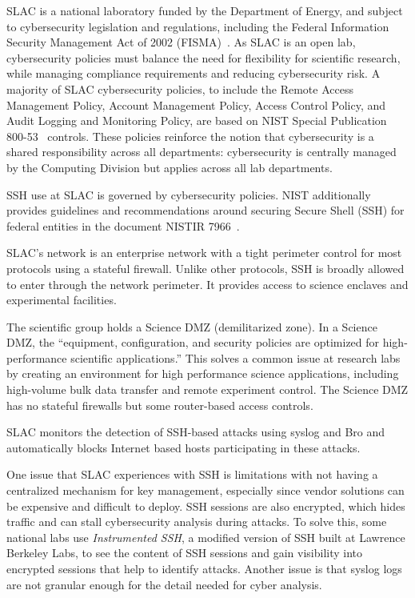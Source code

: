 \documentclass[11pt]{article}
\begin{document}
SLAC is a national laboratory funded by the Department of Energy, and
subject to cybersecurity legislation and regulations, including the
Federal Information Security Management Act of 2002
(FISMA)~\cite{fisma}. As SLAC is an open lab, cybersecurity policies
must balance the need for flexibility for scientific research, while
managing compliance requirements and reducing cybersecurity risk. A
majority of SLAC cybersecurity policies, to include the Remote Access
Management Policy, Account Management Policy, Access Control Policy,
and Audit Logging and Monitoring Policy, are based on NIST Special
Publication 800-53~\cite{nist80053} controls. These policies reinforce
the notion that cybersecurity is a shared responsibility across all
departments: cybersecurity is centrally managed by the Computing
Division but applies across all lab departments.

SSH use at SLAC is governed by cybersecurity policies. NIST
additionally provides guidelines and recommendations around securing
Secure Shell (SSH) for federal entities in the document NISTIR
7966~\cite{nistSSH}.

SLAC's network is an enterprise network with a tight perimeter control
for most protocols using a stateful firewall. Unlike other protocols,
SSH is broadly allowed to enter through the network perimeter. It
provides access to science enclaves and experimental facilities.

The scientific group holds a Science DMZ (demilitarized zone). In a
Science DMZ, the ``equipment, configuration, and security policies are
optimized for high-performance scientific applications.'' This solves
a common issue at research labs by creating an environment for high
performance science applications, including high-volume bulk data
transfer and remote experiment control. The Science DMZ has no
stateful firewalls but some router-based access controls.

SLAC monitors the detection of SSH-based attacks using syslog and Bro
and automatically blocks Internet based hosts participating in these
attacks.

One issue that SLAC experiences with SSH is limitations with not
having a centralized mechanism for key management, especially since
vendor solutions can be expensive and difficult to deploy. SSH
sessions are also encrypted, which hides traffic and can stall
cybersecurity analysis during attacks. To solve this, some national
labs use \emph{Instrumented SSH}, a modified version of SSH built at
Lawrence Berkeley Labs, to see the content of SSH sessions and gain
visibility into encrypted sessions that help to identify
attacks. Another issue is that syslog logs are not granular enough for
the detail needed for cyber analysis.
\end{document}
